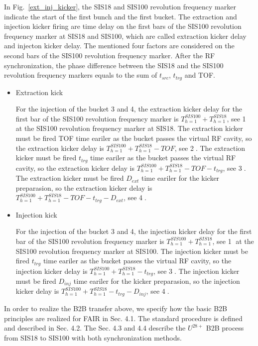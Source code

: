 In Fig.~\ref{ext_inj_kicker}, the SIS18 and SIS100 revolution frequency marker indicate the start of the first bunch and the first bucket. The extraction and injection kicker firing are time delay on the first bars of the SIS100 revolution frequency marker at SIS18 and SIS100, which are called extraction kicker delay and injecton kicker delay. The mentioned four factors are considered on the second bars of the SIS100 revolution frequency marker. After the RF synchronization, the phase difference between the SIS18 and the SIS100 revolution frequency markers equals to the sum of $t_{src}$, $t_{trg}$ and TOF.   
\begin{itemize}
\item Extraction kick

For the injection of the bucket 3 and 4, the extraction kicker delay for the first bar of the SIS100 revolution frequency marker is $T_{h=1}^{SIS100} + T_{h=1}^{SIS18}$, see \textcircled{1} at the SIS100 revolution frequency marker at SIS18. The extraction kicker must be fired TOF time eariler as the bucket passes the virtual RF cavity, so the extraction kicker delay is $T_{h=1}^{SIS100} + T_{h=1}^{SIS18} - TOF$, see \textcircled{2}. The extraction kicker must be fired $t_{trg}$ time eariler as the bucket passes the virtual RF cavity, so the extraction kicker delay is $T_{h=1}^{SIS100} + T_{h=1}^{SIS18} - TOF - t_{trg}$, see \textcircled{3}. The extraction kicker must be fired $D_{ext}$ time eariler for the kicker preparasion, so the extraction kicker delay is $T_{h=1}^{SIS100} + T_{h=1}^{SIS18} - TOF - t_{trg} - D_{ext}$, see \textcircled{4}.

\item Injection kick

For the injection of the bucket 3 and 4, the injection kicker delay for the first bar of the SIS100 revolution frequency marker is $T_{h=1}^{SIS100} + T_{h=1}^{SIS18}$, see \textcircled{1} at the SIS100 revolution frequency marker at SIS100. The injection kicker  must be fired $t_{trg}$ time eariler as the bucket passes the virtual RF cavity, so the injection kicker delay is $T_{h=1}^{SIS100} + T_{h=1}^{SIS18} -  t_{trg}$, see \textcircled{3}. The injection kicker must be fired $D_{inj}$ time eariler for the kicker preparasion, so the injection kicker delay is $T_{h=1}^{SIS100} + T_{h=1}^{SIS18} - t_{trg} - D_{inj}$, see \textcircled{4}.
\end{itemize}

In order to realize the B2B transfer above, we specify how the basic B2B principles are realized for FAIR in Sec. 4.1. The standard procedure is defined and described in Sec. 4.2. The Sec. 4.3 and 4.4 describe the $U^{28+}$ B2B process from SIS18 to SIS100 with both synchronization methods. 
 
